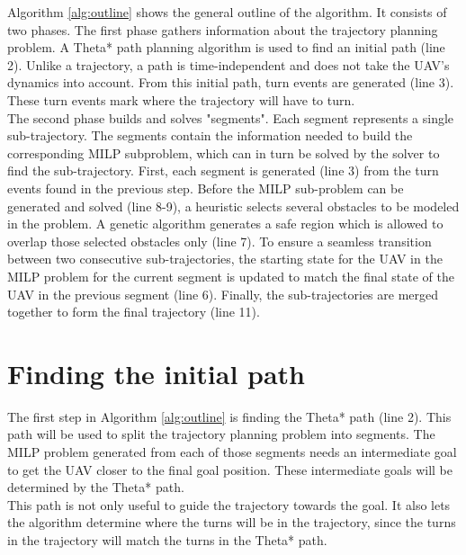 Algorithm \ref{alg:outline} shows the general outline of the algorithm. It consists of two phases. The first phase gathers information about the trajectory planning problem. A Theta* path planning algorithm is used to find an initial path (line 2). Unlike a trajectory, a path is time-independent and does not take the UAV's dynamics into account. From this initial path, turn events are generated (line 3). These turn events mark where the trajectory will have to turn. \\
The second phase builds and solves "segments". Each segment represents a single sub-trajectory. The segments contain the information needed to build the corresponding MILP subproblem, which can in turn be solved by the solver to find the sub-trajectory. First, each segment is generated (line 3) from the turn events found in the previous step. Before the MILP sub-problem can be generated and solved (line 8-9), a heuristic selects several obstacles to be modeled in the problem. A genetic algorithm generates a safe region which is allowed to overlap those selected obstacles only (line 7). To ensure a seamless transition between two consecutive sub-trajectories, the starting state for the UAV in the MILP problem for the current segment is updated to match the final state of the UAV in the previous segment (line 6). Finally, the sub-trajectories are merged together to form the final trajectory (line 11).

\section{Finding the initial path}
\label{subsec:initial-path}
The first step in Algorithm \ref{alg:outline} is finding the Theta* path (line 2). This path will be used to split the trajectory planning problem into segments. The MILP problem generated from each of those segments needs an intermediate goal to get the UAV closer to the final goal position. These intermediate goals will be determined by the Theta* path. \\
This path is not only useful to guide the trajectory towards the goal. It also lets the algorithm determine where the turns will be in the trajectory, since the turns in the trajectory will match the turns in the Theta* path.

